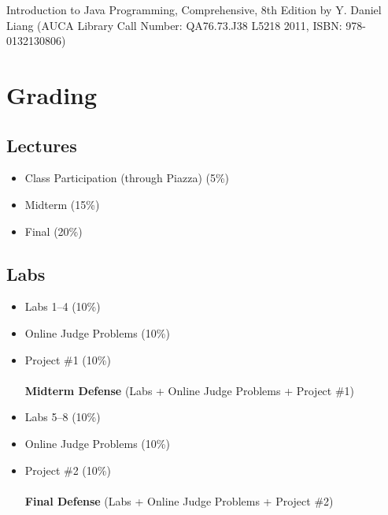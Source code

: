 \documentclass[12pt,a4paper,oneside]{article}
\begin{document}
        Introduction to Java Programming, Comprehensive, 8th Edition by Y.
        Daniel Liang (AUCA Library Call Number: QA76.73.J38 L5218 2011, ISBN:
        978-0132130806)

    \section{Grading}

        \subsection{Lectures}

            \begin{itemize}
            	\item Class Participation (through Piazza) (5\%)
                \item Midterm (15\%)
                \item Final (20\%)
            \end{itemize}

        \subsection{Labs}

            \begin{itemize}
                \item Labs 1--4 (10\%)
                \item Online Judge Problems (10\%)
                \item Project \#1 (10\%)\\\\
                    \textbf{Midterm Defense} (Labs + Online Judge Problems + Project \#1)\\
                \item Labs 5--8 (10\%)
                \item Online Judge Problems (10\%)
                \item Project \#2 (10\%)\\\\
                    \textbf{Final Defense} (Labs + Online Judge Problems + Project \#2)\\
            \end{itemize}
\end{document}

